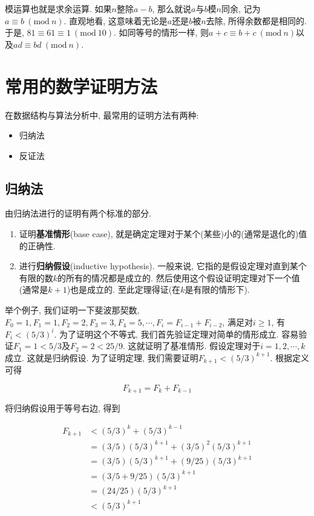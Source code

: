 \documentclass[oneside,10pt,fontset=none]{ctexbook}
\numberwithin{definition}{chapter}
\numberwithin{theorem}{chapter}
\numberwithin{lemma}{chapter}
\begin{document}
\newcommand{\Mod}[1]{\ (\mathrm{mod}\ #1)}

模运算也就是求余运算. 如果$n$整除$a-b$, 那么就说$a$与$b$模$n$同余, 记为$a\equiv b\Mod{n}$. 直观地看, 这意味着无论是$a$还是$b$被$n$去除, 所得余数都是相同的. 于是, $81\equiv 61\equiv 1\Mod{10}$. 如同等号的情形一样, 则$a+c\equiv b+c\Mod{n}$以及$ad\equiv bd\Mod{n}$.

\section{常用的数学证明方法}

在数据结构与算法分析中, 最常用的证明方法有两种:

\begin{itemize}
    \item 归纳法
    \item 反证法
\end{itemize}

\subsection{归纳法}

由归纳法进行的证明有两个标准的部分.

\begin{enumerate}
    \item 证明\textbf{基准情形}(base case), 就是确定定理对于某个(某些)小的(通常是退化的)值的正确性.
    \item 进行\textbf{归纳假设}(inductive hypothesis). 一般来说, 它指的是假设定理对直到某个有限的数$k$的所有的情况都是成立的. 然后使用这个假设证明定理对下一个值(通常是$k+1$)也是成立的. 至此定理得证(在$k$是有限的情形下).
\end{enumerate}

举个例子, 我们证明一下斐波那契数, $F_0=1,F_1=1,F_2=2,F_3=3,F_4=5,\cdots,F_i=F_{i-1}+F_{i-2}$, 满足对$i\geq 1$, 有$F_i<(5/3)^i$. 为了证明这个不等式, 我们首先验证定理对简单的情形成立. 容易验证$F_1=1<5/3$及$F_2=2<25/9$. 这就证明了基准情形. 假设定理对于$i=1,2,\cdots,k$成立. 这就是归纳假设. 为了证明定理, 我们需要证明$F_{k+1}<(5/3)^{k+1}$. 根据定义可得

$$
F_{k+1} = F_k + F_{k-1}
$$

将归纳假设用于等号右边, 得到

\begin{equation*}
    \begin{split}
        F_{k+1} &< (5/3)^k + (5/3)^{k-1} \\
                &= (3/5)(5/3)^{k+1} + (3/5)^2(5/3)^{k+1} \\
                &= (3/5)(5/3)^{k+1} + (9/25)(5/3)^{k+1} \\
                &= (3/5+9/25)(5/3)^{k+1} \\
                &= (24/25)(5/3)^{k+1} \\
                &< (5/3)^{k+1}
    \end{split}
\end{equation*}
\end{document}
